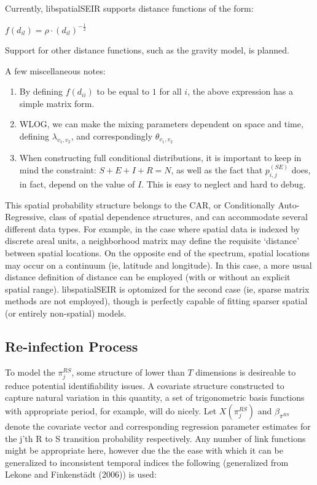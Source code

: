 \documentclass[12pt]{article}
\newcommand \mbreak {\\ \vspace{0.1in}}
\begin{document}
Currently, libspatialSEIR supports distance functions of the form:

\begin{center}
    $f(d_{il}) = \rho \cdot (d_{il})^{-\frac{1}{2}}$
\end{center}

Support for other distance functions, such as the gravity model, is planned. \mbreak


A few miscellaneous notes: 
\begin{enumerate}
    \item By defining $f(d_{ii})$ to be equal to $1$ for all $i$, the above expression has a simple 
        matrix form. 
    \item WLOG, we can make the mixing parameters dependent on space and time, defining $\lambda_{v_1, v_2}$,
        and correspondingly $\theta_{v_1,v_2}$
    \item When constructing full conditional distributions, it is important to keep in mind the constraint:
        $S+E+I+R=N$, as well as the fact that $p_{i,j}^{(SE)}$ does, in fact, depend on the value of $I$.
        This is easy to neglect and hard to debug.  \\
        
\end{enumerate}
This spatial probability structure belongs to the CAR, or Conditionally Auto-Regressive, class
of spatial dependence structures, and can accommodate several different data types. For example, 
in the case where spatial data is indexed by discrete areal units, a neighborhood matrix may define
the requisite `distance' between spatial locations. On the opposite end of the spectrum, spatial locations 
may occur on a continuum (ie, latitude and longitude). In this case, a more usual distance definition of 
distance can be employed (with or without an explicit spatial range). libspatialSEIR is optomized for the 
second case (ie, sparse matrix methods are not employed), though is perfectly
capable of fitting sparser spatial (or entirely non-spatial) models.\\ 


\subsection{Re-infection Process}


To model the $\pi_j^{RS}$, some structure of lower than $T$ dimensions is desireable to reduce potential 
identifiability issues. A covariate structure constructed to capture natural variation in this quantity,
a set of trigonometric basis functions with appropriate period, for example, will do nicely. Let $X(\pi_j^{RS})$ and $\beta_{\pi^{RS}}$ 
denote the covariate vector and corresponding regression parameter estimates 
for the j'th R to S transition probability respectively. Any number of link functions might be appropriate here, 
however due the the ease with which it can be generalized to inconsistent temporal indices the following (generalized from
Lekone and Finkenst{\"a}dt (2006)) 
is used:
\end{document}
